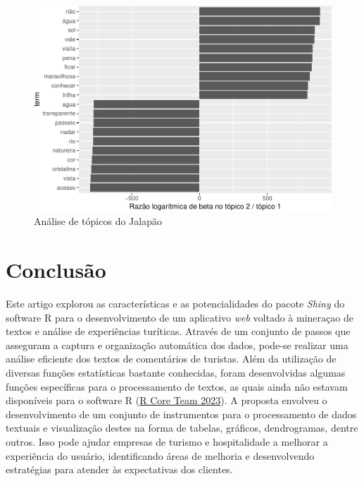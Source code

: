 \documentclass[preprint, 3p,
authoryear]{elsarticle} %
\begin{document}
\begin{figure}[H]

{\centering \includegraphics{bookdown-artigo_files/figure-latex/fig13-1} 

}

\caption{Análise de tópicos do Jalapão}\label{fig:fig13}
\end{figure}

\hypertarget{conclusuxe3o}{%
\section{Conclusão}\label{conclusuxe3o}}

Este artigo explorou as características e as potencialidades do pacote
\emph{Shiny} do software R para o desenvolvimento de um aplicativo
\emph{web} voltado à mineraçao de textos e análise de experiências
turíticas. Através de um conjunto de passos que asseguram a captura e
organização automática dos dados, pode-se realizar uma análise eficiente
dos textos de comentários de turistas. Além da utilização de diversas
funções estatísticas bastante conhecidas, foram desenvolvidas algumas
funções específicas para o processamento de textos, as quais ainda não
estavam disponíveis para o software R (\protect\hyperlink{ref-R-base}{R
Core Team 2023}). A proposta envolveu o desenvolvimento de um conjunto
de instrumentos para o processamento de dados textuais e visualização
destes na forma de tabelas, gráficos, dendrogramas, dentre outros. Isso
pode ajudar empresas de turismo e hospitalidade a melhorar a experiência
do usuário, identificando áreas de melhoria e desenvolvendo estratégias
para atender às expectativas dos clientes.
\end{document}
